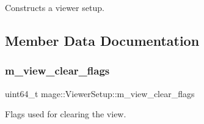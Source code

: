 Constructs a viewer setup. 

\subsection{Member Data Documentation}
\hypertarget{structmage_1_1_viewer_setup_aed7b78b5437c46627949142f628c331d}{}\label{structmage_1_1_viewer_setup_aed7b78b5437c46627949142f628c331d} 
\subsubsection{\texorpdfstring{m\+\_\+view\+\_\+clear\+\_\+flags}{m\_view\_clear\_flags}}
{\footnotesize\ttfamily uint64\+\_\+t mage\+::\+Viewer\+Setup\+::m\+\_\+view\+\_\+clear\+\_\+flags}

Flags used for clearing the view. 
